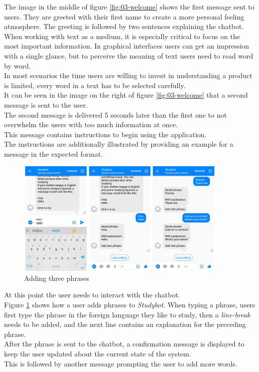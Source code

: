 The image in the middle of figure \ref{fig:03-welcome} shows the first message sent to users.
They are greeted with their first name to create a more personal feeling atmosphere.
The greeting is followed by two sentences explaining the chatbot.
\\
When working with text as a medium, it is especially critical to focus on the most important information.
In graphical interfaces users can get an impression with a single glance,
but to perceive the meaning of text users need to read word by word.
\\
In most scenarios the time users are willing to invest in understanding a product is limited,
every word in a text has to be selected carefully.
\\

It can be seen in the image on the right of figure \ref{fig:03-welcome} that a second message is sent to the user.
\\
The second message is delivered 5 seconds later than the first one to not overwhelm the users with too much information at once.
\\
This message contains instructions to begin using the application.
\\
The instructions are additionally illustrated by providing an example for a message in the expected format.
\\

\begin{figure}[h]
  \centering
  \includegraphics[width=0.9\textwidth]{images/interface/04-add.png}
	\caption{Adding three phrases}
	\label{fig:04-add}
\end{figure}

At this point the user needs to interact with the chatbot.
\\
Figure \ref{fig:04-add} shows how a user adds phrases to \emph{Studybot}.
When typing a phrase, users first type the phrase in the foreign language they like to study,
then a \emph{line-break} needs to be added,
and the next line contains an explanation for the preceding phrase.
\\
After the phrase is sent to the chatbot,
a confirmation message is displayed to keep the user updated about the current state of the system.
\\
This is followed by another message prompting the user to add more words.
\\

